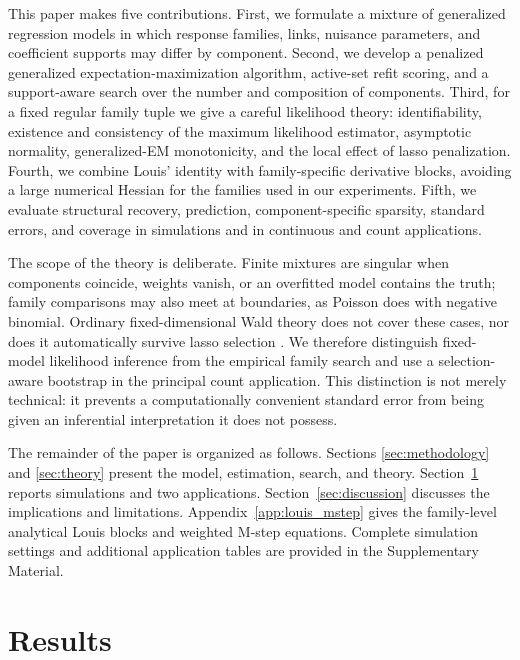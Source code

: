 \documentclass[11pt]{article}
\begin{document}
This paper makes five contributions.  First, we formulate a mixture of
generalized regression models in which response families, links, nuisance
parameters, and coefficient supports may differ by component.  Second, we
develop a penalized generalized expectation-maximization algorithm, active-set
refit scoring, and a support-aware search over the number and composition of
components.  Third, for a fixed regular family
tuple we give a careful likelihood theory: identifiability, existence and
consistency of the maximum likelihood estimator, asymptotic normality,
generalized-EM monotonicity, and the local effect of lasso penalization.  Fourth,
we combine Louis' identity \citep{louis1982information} with family-specific
derivative blocks, avoiding a large numerical Hessian for the families used in
our experiments.  Fifth, we evaluate structural recovery, prediction,
component-specific sparsity, standard errors, and coverage in simulations and
in continuous and count applications.

The scope of the theory is deliberate.  Finite mixtures are singular when
components coincide, weights vanish, or an overfitted model contains the truth;
family comparisons may also meet at boundaries, as Poisson does with negative
binomial.  Ordinary fixed-dimensional Wald theory does not cover these cases,
nor does it automatically survive lasso selection
\citep{knight2000asymptotics,drton2017sbic}.  We therefore distinguish
fixed-model likelihood inference from the empirical family search and use a
selection-aware bootstrap in the principal count application.  This distinction
is not merely technical: it prevents a computationally convenient standard
error from being given an inferential interpretation it does not possess.

The remainder of the paper is organized as follows.  Sections
\ref{sec:methodology} and \ref{sec:theory} present the model, estimation,
search, and theory.  Section~\ref{sec:results} reports simulations and two
applications.  Section~\ref{sec:discussion} discusses the implications and
limitations.  Appendix~\ref{app:louis_mstep} gives the family-level analytical
Louis blocks and weighted M-step equations.  Complete simulation settings and
additional application tables are provided in the Supplementary Material.



\section{Results}
\label{sec:results}
\end{document}
